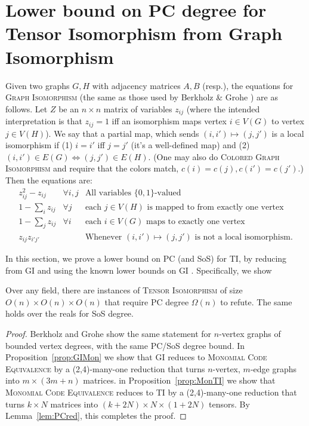 

\section{Lower bound on PC degree for Tensor Isomorphism from Graph Isomorphism} \label{sec:lowerboundGI}
\begin{definition} \label{def:GI}
Given two graphs $G,H$ with adjacency matrices $A,B$ (resp.), the equations for \textsc{Graph Isomorphism} (the same as those used by Berkholz \& Grohe \cite{BerkholzG15,BerkholzG16}) are as follows. Let $Z$ be an $n \times n$ matrix of variables $z_{ij}$ (where the intended interpretation is that $z_{ij}=1$ iff an isomorphism maps vertex $i \in V(G)$ to vertex $j \in V(H)$). We say that a partial map, which sends $(i,i') \mapsto (j,j')$ is a local isomorphism if (1) $i=i'$ iff $j=j'$ (it's a well-defined map) and (2) $(i,i') \in E(G) \Leftrightarrow (j,j') \in E(H)$. (One may also do \textsc{Colored Graph Isomorphism} and require that the colors match, $c(i) = c(j), c(i')=c(j')$.) Then the equations are:
\[
\begin{array}{rll}
z_{ij}^2 - z_{ij} & \forall i,j & \text{All variables $\{0,1\}$-valued} \\
1 - \sum_i z_{ij} & \forall j & \text{each $j \in V(H)$ is mapped to from exactly one vertex} \\
1 - \sum_j z_{ij} & \forall i & \text{each $i \in V(G)$ maps to exactly one vertex} \\
z_{ij} z_{i'j'} & & \text{Whenever $(i,i') \mapsto (j,j')$ is not a local isomorphism}.
\end{array}
\]
\end{definition}

In this section, we prove a lower bound on PC (and SoS) for \textsc{TI}, by reducing from \textsc{GI} and using the known lower bounds on \textsc{GI} \cite{BerkholzG15,BerkholzG16}. Specifically, we show

\begin{theorem}
Over any field, there are instances of \textsc{Tensor Isomorphism} of size $O(n) \times O(n) \times O(n)$ that require PC degree $\Omega(n)$ to refute. The same holds over the reals for SoS degree.
\end{theorem}

\begin{proof}
Berkholz and Grohe \cite{BerkholzG15,BerkholzG16} show the same statement for $n$-vertex graphs of bounded vertex degrees, with the same PC/SoS degree bound. In Proposition~\ref{prop:GIMon} we show that \textsc{GI} reduces to \textsc{Monomial Code Equivalence} by a (2,4)-many-one reduction that turns $n$-vertex, $m$-edge graphs into $m \times (3m+n)$ matrices. in Proposition~\ref{prop:MonTI} we show that \textsc{Monomial Code Equivalence} reduces to \textsc{TI} by a (2,4)-many-one reduction that turns $k \times N$ matrices into $(k + 2N) \times N \times (1 + 2N)$ tensors. By Lemma~\ref{lem:PCred}, this completes the proof.
\end{proof}



